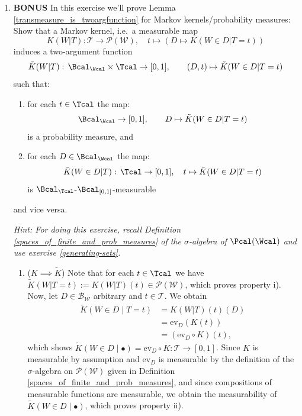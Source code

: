 \begin{enumerate}
\item \textbf{BONUS}
In this exercise we'll prove Lemma \ref*{transmeasure_is_twoargfunction} for Markov kernels/probability measures: Show that a Markov kernel, i.e.\ a measurable map
\[ K(W|T): \mathcal{T}\rightarrow \mathcal{P}(\mathcal{W}), \quad t\mapsto (D\mapsto K(W\in D|T=t)) \]
induces a two-argument function
\[ \tilde K(W|T):\, \Bcal_\Wcal \times \Tcal \to [0,1], \qquad (D,t) \mapsto \tilde K(W \in D|T=t) \]
such that:
\begin{enumerate}[label=\roman*)]
  \item for each $t \in \Tcal$ the map:
      \[ \Bcal_\Wcal \to [0,1],\qquad D \mapsto \tilde K(W\in D|T=t)\]
      is a probability measure, and
  \item for each $D \in \Bcal_\Wcal$ the map:
      \[ \tilde K(W \in D|T):\, \Tcal \to [0,1],\quad t \mapsto \tilde K(W \in D|T=t) \]
      is $\Bcal_\Tcal$-$\Bcal_{[0,1]}$-measurable
\end{enumerate}
and vice versa.

\emph{Hint: For doing this exercise, recall Definition \ref*{spaces_of_finite_and_prob_measures} of the $\sigma$-algebra of $\Pcal(\Wcal)$ and use exercise \ref*{generating-sets}.}
\begin{gradedsolution}
  \begin{enumerate}
    \item ($K\implies \tilde{K}$) Note that for each $t\in\Tcal$ we have $\tilde{K}(W | T=t) := K(W|T)(t) \in \mathcal{P}(\mathcal{W})$, which proves property i).
    Now, let $D \in \mathcal{B}_{\mathcal{W}}$ arbitrary and $t \in \mathcal{T}$.
    We obtain
    \begin{align*}
      \tilde{K}(W\in D \mid T=t) & = K(W|T)(t)(D) \\
      & = \text{ev}_D(K(t)) \\
      & = (\text{ev}_D \circ K)(t),
    \end{align*}
    which shows $\tilde{K}(W\in D \mid \bullet) = \text{ev}_D \circ K: \mathcal{T} \to [0,1]$.
    Since $K$ is measurable by assumption and $\text{ev}_D$ is measurable by the definition of the $\sigma$-algebra on $\mathcal{P}(\mathcal{W})$ given in Definition \ref*{spaces_of_finite_and_prob_measures}, and since compositions of measurable functions are measurable, we obtain the measurability of $\tilde{K}(W\in D \mid \bullet)$, which proves property ii).


\end{enumerate}
\end{gradedsolution}
\end{enumerate}
